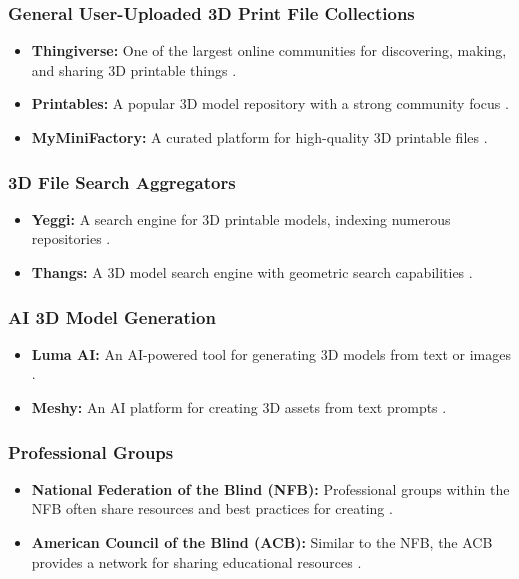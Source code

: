 \subsubsection{General User-Uploaded 3D Print File Collections}
\begin{itemize}
	\item \textbf{Thingiverse:} One of the largest online communities for discovering, making, and sharing 3D printable things \supercite{Thingiverse}.
	\item \textbf{Printables:} A popular 3D model repository with a strong community focus \supercite{Printables}.
	\item \textbf{MyMiniFactory:} A curated platform for high-quality 3D printable files \supercite{MyMiniFactory}.
\end{itemize}

\subsubsection{3D File Search Aggregators}
\begin{itemize}
	\item \textbf{Yeggi:} A search engine for 3D printable models, indexing numerous repositories \supercite{Yeggi}.
	\item \textbf{Thangs:} A 3D model search engine with geometric search capabilities \supercite{Thangs}.
\end{itemize}

\subsubsection{AI 3D Model Generation}
\begin{itemize}
	\item \textbf{Luma AI:} An AI-powered tool for generating 3D models from text or images \supercite{LumaAI}.
	\item \textbf{Meshy:} An AI platform for creating 3D assets from text prompts \supercite{Meshy}.
\end{itemize}

\subsubsection{Professional Groups}
\begin{itemize}
	\item \textbf{National Federation of the Blind (NFB):} Professional groups within the NFB often share resources and best practices for creating  \supercite{NFB}.
	\item \textbf{American Council of the Blind (ACB):} Similar to the NFB, the ACB provides a network for sharing educational resources \supercite{ACB}.
\end{itemize}

